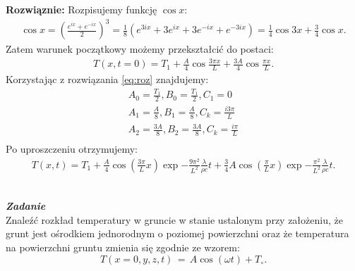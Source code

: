 \documentclass[11pt,a4paper]{article}
\newcounter{zadanie}\newcommand{\zadanie}[1][]{\addtocounter{zadanie}{1} ~\\  {\bf \emph{Zadanie \arabic{zadanie} #1 }} \\}
\begin{document}
\vspace{0.2cm}
\textbf{Rozwiąznie:} 
Rozpisujemy funkcję $\cos{x}$:
\begin{align}
\cos{x} = \left( \frac{e^{i x} +  e^{-i x} }{2}\right)^3 = \frac{1}{8}\left(e^{3i x} + 3 e^{i x} + 3 e^{-i x} + e^{-3i x}\right)= \frac{1}{4} \cos{3x} + \frac{3}{4}\cos{x}.
\end{align}
Zatem warunek początkowy możemy przekształcić do postaci:
\begin{align}
T(x, t=0) = T_1 + \frac{A}{4} \cos{\frac{3 \pi x}{L}} + \frac{3A}{4} \cos{\frac{ \pi x}{L}}.
\end{align}
Korzystając z rozwiązania \eqref{eq:roz} znajdujemy:
\begin{align}
A_0 = \frac{T_1}{2}, B_0 = \frac{T_1}{2},  C_1 = 0 \\
A_1= \frac{A}{8}, B_1= \frac{A}{8}, C_k = \frac{i 3 \pi}{L}\\
A_2= \frac{3A}{8}, B_2= \frac{3A}{8}, C_k = \frac{i \pi}{L}\\
\end{align}
Po uproszczeniu otrzymujemy:
\begin{align}
T(x, t ) = T_1 + \frac{A}{4} \cos{\left( \frac{3 \pi}{L}x \right)} \exp{- \frac{9 \pi^2}{L^2}\frac{\lambda}{\rho c}t} + \frac{3}{4}A \cos{\left( \frac{ \pi}{L}x \right)} \exp{- \frac{\pi^2}{L^2}\frac{\lambda}{\rho c}t}.
\end{align}

\newpage

\zadanie
Znaleźć rozkład temperatury w gruncie w stanie ustalonym przy założeniu,
że grunt jest ośrodkiem jednorodnym o poziomej powierzchni oraz że
temperatura na powierzchni gruntu zmienia się zgodnie ze wzorem:
\[ T(x=0, y,z,t) \,=\, A \cos(\omega t) + T_\circ. \]
\end{document}
